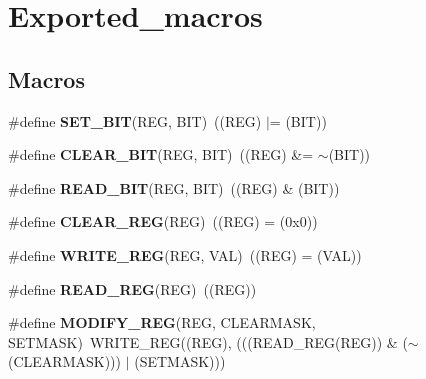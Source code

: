 \hypertarget{group___exported__macros}{\section{Exported\-\_\-macros}
\label{group___exported__macros}
}
\subsection*{Macros}
\begin{DoxyCompactItemize}
\item 
\hypertarget{group___exported__macros_ga26474f43799fbade9cf300e21dd3a91a}{\#define {\bfseries S\-E\-T\-\_\-\-B\-I\-T}(R\-E\-G, B\-I\-T)~((R\-E\-G) $\vert$= (B\-I\-T))}\label{group___exported__macros_ga26474f43799fbade9cf300e21dd3a91a}

\item 
\hypertarget{group___exported__macros_ga133aae6fc0d41bffab39ab223a7001de}{\#define {\bfseries C\-L\-E\-A\-R\-\_\-\-B\-I\-T}(R\-E\-G, B\-I\-T)~((R\-E\-G) \&= $\sim$(B\-I\-T))}\label{group___exported__macros_ga133aae6fc0d41bffab39ab223a7001de}

\item 
\hypertarget{group___exported__macros_ga822bb1bb9710d5f2fa6396b84e583c33}{\#define {\bfseries R\-E\-A\-D\-\_\-\-B\-I\-T}(R\-E\-G, B\-I\-T)~((R\-E\-G) \& (B\-I\-T))}\label{group___exported__macros_ga822bb1bb9710d5f2fa6396b84e583c33}

\item 
\hypertarget{group___exported__macros_ga1378fbdda39f40b85420df55f41460ef}{\#define {\bfseries C\-L\-E\-A\-R\-\_\-\-R\-E\-G}(R\-E\-G)~((R\-E\-G) = (0x0))}\label{group___exported__macros_ga1378fbdda39f40b85420df55f41460ef}

\item 
\hypertarget{group___exported__macros_ga32f78bffcaf6d13023dcd7f05e0c4d57}{\#define {\bfseries W\-R\-I\-T\-E\-\_\-\-R\-E\-G}(R\-E\-G, V\-A\-L)~((R\-E\-G) = (V\-A\-L))}\label{group___exported__macros_ga32f78bffcaf6d13023dcd7f05e0c4d57}

\item 
\hypertarget{group___exported__macros_gae7f188a4d26c9e713a48414783421071}{\#define {\bfseries R\-E\-A\-D\-\_\-\-R\-E\-G}(R\-E\-G)~((R\-E\-G))}\label{group___exported__macros_gae7f188a4d26c9e713a48414783421071}

\item 
\hypertarget{group___exported__macros_ga6553c99f510c3bab8cc0a91602053247}{\#define {\bfseries M\-O\-D\-I\-F\-Y\-\_\-\-R\-E\-G}(R\-E\-G, C\-L\-E\-A\-R\-M\-A\-S\-K, S\-E\-T\-M\-A\-S\-K)~W\-R\-I\-T\-E\-\_\-\-R\-E\-G((R\-E\-G), (((R\-E\-A\-D\-\_\-\-R\-E\-G(R\-E\-G)) \& ($\sim$(C\-L\-E\-A\-R\-M\-A\-S\-K))) $\vert$ (S\-E\-T\-M\-A\-S\-K)))}\label{group___exported__macros_ga6553c99f510c3bab8cc0a91602053247}


\end{DoxyCompactItemize}
